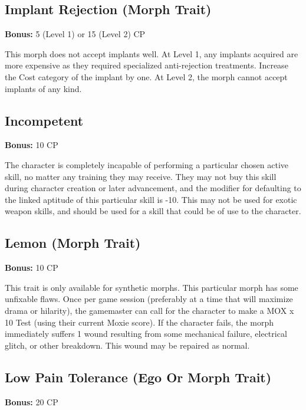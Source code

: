 \subsection{Implant Rejection (Morph Trait)} \label{sec:traits-implant-rejection} 

\textbf{Bonus:} 5 (Level 1) or 15 (Level 2) CP 

This morph does not accept implants well. At Level 1, any implants acquired are more expensive as they required specialized anti-rejection treatments. Increase the Cost category of the implant by one. At Level 2, the morph cannot accept implants of any kind. 

\subsection{Incompetent} \label{sec:traits-incompetent} 

\textbf{Bonus:} 10 CP 

The character is completely incapable of performing a particular chosen active skill, no matter any training they may receive. They may not buy this skill during character creation or later advancement, and the modifier for defaulting to the linked aptitude of this particular skill is -10. This may not be used for exotic weapon skills, and should be used for a skill that could be of use to the character. 

\subsection{Lemon (Morph Trait)} \label{sec:traits-lemon} 

\textbf{Bonus:} 10 CP 

This trait is only available for synthetic morphs. This particular morph has some unfixable flaws. Once per game session (preferably at a time that will maximize drama or hilarity), the gamemaster can call for the character to make a MOX x 10 Test (using their current Moxie score). If the character fails, the morph immediately suffers 1 wound resulting from some mechanical failure, electrical glitch, or other breakdown. This wound may be repaired as normal. 

\subsection{Low Pain Tolerance (Ego Or Morph Trait)} \label{sec:traits-low-pain-tolerance} 

\textbf{Bonus:} 20 CP 

